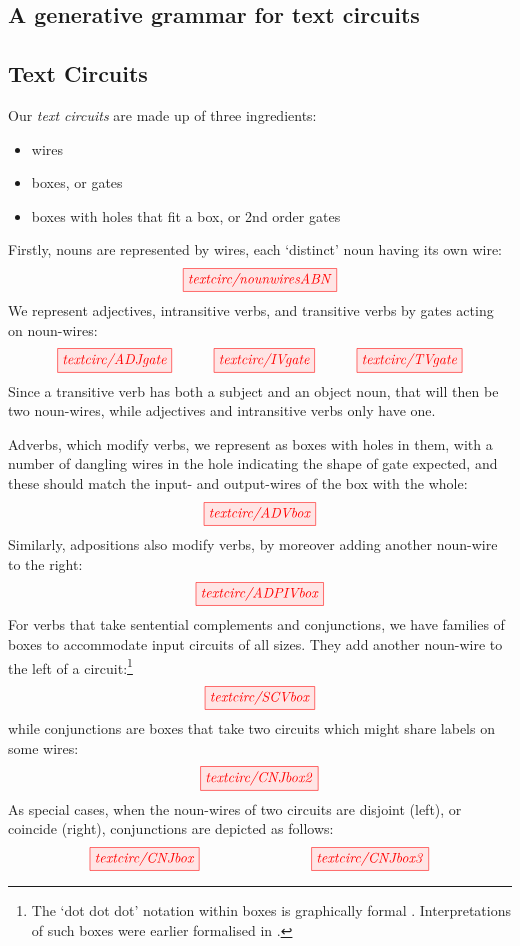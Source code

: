 \begin{fullwidth}

\section{A generative grammar for text circuits}

\subsection{Text Circuits}

Our \emph{text circuits} are made up of three ingredients:
\begin{itemize}
\item wires
\item boxes, or gates
\item boxes with holes that fit a box, or 2nd order gates
\end{itemize}
Firstly, nouns are represented by wires, each `distinct' noun having its own wire:
\[
\tikzfig{textcirc/nounwiresABN} 
\]
We represent adjectives, intransitive verbs, and transitive verbs by gates acting on noun-wires: 
\[
\tikzfig{textcirc/ADJgate} \quad\quad\quad \tikzfig{textcirc/IVgate} \quad\quad\quad \tikzfig{textcirc/TVgate}
\]
Since a transitive verb has both a subject and an object  noun, that will then be two noun-wires, while adjectives and intransitive verbs only have one. 

Adverbs, which modify verbs, we represent as boxes with holes in them, with a number of dangling wires in the hole indicating the shape of gate expected, and these should match the input- and output-wires  of the box with the whole:
\[
\tikzfig{textcirc/ADVbox}
\]
Similarly, adpositions also modify verbs, by moreover adding another noun-wire to the right:
\[
\tikzfig{textcirc/ADPIVbox}
\]
For verbs that take sentential complements and conjunctions, we have families of boxes to accommodate input circuits of all sizes. They add another noun-wire to the left of a circuit:\footnote{The `dot dot dot' notation within boxes is graphically formal \cite{wilson_string_2022}. Interpretations of such boxes were earlier formalised in \cite{merry_reasoning_2014,quick_-logic_2015,zamdzhiev_rewriting_2017}.}
\[
\tikzfig{textcirc/SCVbox}
\]
while conjunctions are boxes that take two circuits which might share labels on some wires:
\[
\tikzfig{textcirc/CNJbox2}
\]
As special cases, when the noun-wires of two circuits are disjoint (left), or coincide (right), conjunctions are depicted as follows:
\[
\tikzfig{textcirc/CNJbox} \qquad\qquad\qquad\qquad \tikzfig{textcirc/CNJbox3}
\]


\end{fullwidth}

